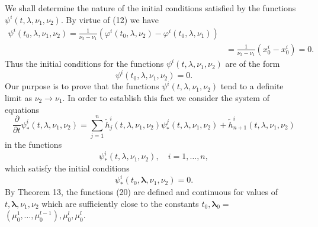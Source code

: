 \documentclass[10pt,a5paper]{book}
\makeatletter
\theoremstyle{plain}
\theoremstyle{definition}
\theoremstyle{remark}
\renewenvironment{proof}[1][\proofname]{\par
  \pushQED{\qed}%
  \normalfont\topsep6\p@\@plus6\p@\relax
  \trivlist
  \item\relax{\itshape #1\@addpunct{.}}\hspace\labelsep\ignorespaces
}{\popQED\endtrivlist\@endpefalse}
\makeatother
\begin{document}
\begin{proof}
We shall determine the nature of the initial conditions satisfied by the functions $\psi^{i}\left(t, \lambda, \nu_{1}, \nu_{2}\right)$. By virtue of (12) we have
\[
\begin{aligned}
\psi^{i}\left(t_{0}, \lambda, \nu_{1}, \nu_{2}\right)=\frac{1}{\nu_{2}-\nu_{1}}\left(\varphi^{i}\left(t_{0}, \lambda, \nu_{2}\right)-\varphi^{i}\left(t_{0}, \lambda, \nu_{1}\right)\right) & \\
& =\frac{1}{\nu_{2}-\nu_{1}}\left(x_{0}^{i}-x_{0}^{i}\right)=0 .
\end{aligned}
\]
Thus the initial conditions for the functions $\psi^{i}\left(t, \lambda, \nu_{1}, \nu_{2}\right)$ are of the form
\[
\psi^{i}\left(t_{0}, \lambda, \nu_{1}, \nu_{2}\right)=0 .
\]
Our purpose is to prove that the functions $\psi^{i}\left(t, \lambda, \nu_{1}, \nu_{2}\right)$ tend to a definite limit as $\nu_{2} \rightarrow \nu_{1}$. In order to establish this fact we consider the system of equations
\begin{equation*}
\frac{\partial}{\partial t} \psi_{*}^{i}\left(t, \lambda, \nu_{1}, \nu_{2}\right)=\sum_{j=1}^{n} \tilde{h}_{j}^{i}\left(t, \lambda, \nu_{1}, \nu_{2}\right) \psi_{*}^{j}\left(t, \lambda, \nu_{1}, \nu_{2}\right)+\tilde{h}_{n+1}^{i}\left(t, \lambda, \nu_{1}, \nu_{2}\right) \tag{19}
\end{equation*}
in the functions
\begin{equation*}
\psi_{*}^{i}\left(t, \lambda, \nu_{1}, \nu_{2}\right), \quad i=1, \ldots, n, \tag{20}
\end{equation*}
which satisfy the initial conditions
\[
\psi_{*}^{i}\left(t_{0}, \boldsymbol{\lambda}, \nu_{1}, \nu_{2}\right)=0 .
\]
By Theorem 13, the functions (20) are defined and continuous for values of $t, \mathbf{\lambda}, \nu_{1}, \nu_{2}$ which are sufficiently close to the constants $t_{0}, \boldsymbol{\lambda}_{0}=$ $\left(\mu_{0}^{1}, \ldots, \mu_{0}^{l-1}\right), \mu_{0}^{l}, \mu_{0}^{l}$.


\end{proof}
\end{document}
